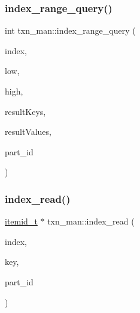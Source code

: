 \mbox{\label{classtxn__man_aa8a892b52707588c411662822359b63a}} 
\subsubsection{\texorpdfstring{index\+\_\+range\+\_\+query()}{index\_range\_query()}}
{\footnotesize\ttfamily int txn\+\_\+man\+::index\+\_\+range\+\_\+query (\begin{DoxyParamCaption}\item[{\hyperlink{classIndex}{Index} $\ast$}]{index,  }\item[{\hyperlink{global_8h_a29a17e29c9200c833b70a4ef8c89813e}{idx\+\_\+key\+\_\+t}}]{low,  }\item[{\hyperlink{global_8h_a29a17e29c9200c833b70a4ef8c89813e}{idx\+\_\+key\+\_\+t}}]{high,  }\item[{\hyperlink{global_8h_a29a17e29c9200c833b70a4ef8c89813e}{idx\+\_\+key\+\_\+t} $\ast$}]{result\+Keys,  }\item[{\hyperlink{classitemid__t}{itemid\+\_\+t} $\ast$$\ast$}]{result\+Values,  }\item[{int}]{part\+\_\+id }\end{DoxyParamCaption})}

\mbox{\label{classtxn__man_a3fa753d12f78c728e33f86c5c119a191}} 
\subsubsection{\texorpdfstring{index\+\_\+read()}{index\_read()}\hspace{0.1cm}{\footnotesize\ttfamily [1/2]}}
{\footnotesize\ttfamily \hyperlink{classitemid__t}{itemid\+\_\+t} $\ast$ txn\+\_\+man\+::index\+\_\+read (\begin{DoxyParamCaption}\item[{\hyperlink{classIndex}{Index} $\ast$}]{index,  }\item[{\hyperlink{global_8h_a29a17e29c9200c833b70a4ef8c89813e}{idx\+\_\+key\+\_\+t}}]{key,  }\item[{int}]{part\+\_\+id }\end{DoxyParamCaption})}

